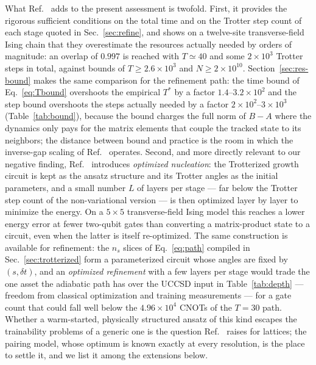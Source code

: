 \documentclass[
  aps,            %
  prc,            %
  reprint,        %
  superscriptaddress,
  floatfix,
  nofootinbib
]{revtex4-2}
\begin{document}
What Ref.~\cite{Sadia2026} adds to the present assessment is twofold.  First,
it provides the rigorous sufficient conditions on the total time and on the
Trotter step count of each stage quoted in Sec.~\ref{sec:refine}, and shows on
a twelve-site transverse-field Ising chain that they overestimate the
resources actually needed by orders of magnitude: an overlap of $0.997$ is
reached with $T\simeq40$ and some $2\times10^{3}$ Trotter steps in total,
against bounds of $T\ge2.6\times10^{3}$ and $N\ge2\times10^{10}$.  Section~\ref{sec:res-bound} makes the same comparison for the refinement
path: the time bound of Eq.~\eqref{eq:Tbound} overshoots the empirical
$T^{*}$ by a factor $1.4$--$3.2\times10^{2}$ and the step bound overshoots
the steps actually needed by a factor $2\times10^{2}$--$3\times10^{3}$
(Table~\ref{tab:bound}), because the bound charges the full norm of $B-A$
where the dynamics only pays for the matrix elements that couple the tracked
state to its neighbors; the distance between bound and practice is the room
in which the inverse-gap scaling of Ref.~\cite{Bogner2026} operates.  Second, and more directly
relevant to our negative finding, Ref.~\cite{Sadia2026} introduces
\emph{optimized nucleation}: the Trotterized growth circuit is kept as the
ansatz structure and its Trotter angles as the initial parameters, and a
small number $L$ of layers per stage --- far below the Trotter step count of
the non-variational version --- is then optimized layer by layer to minimize
the energy.  On a $5\times5$ transverse-field Ising model this reaches a
lower energy error at fewer two-qubit gates than converting a matrix-product
state to a circuit, even when the latter is itself re-optimized.  The same
construction is available for refinement: the $n_s$ slices of
Eq.~\eqref{eq:path} compiled in Sec.~\ref{sec:trotterized} form a
parameterized circuit whose angles are fixed by $(s,\delta t)$, and an
\emph{optimized refinement} with a few layers per stage would trade the one
asset the adiabatic path has over the UCCSD input in Table~\ref{tab:depth}
--- freedom from classical optimization and training measurements --- for a
gate count that could fall well below the $4.96\times10^{4}$ CNOTs of the
$T=30$ path.  Whether a warm-started, physically structured ansatz of this
kind escapes the trainability problems of a generic one is the question
Ref.~\cite{Sadia2026} raises for lattices; the pairing model, whose optimum
is known exactly at every resolution, is the place to settle it, and we list
it among the extensions below.
\end{document}
